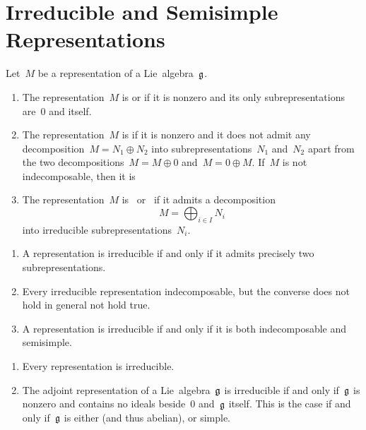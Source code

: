 \section{Irreducible and Semisimple Representations}


\begin{definition}
	Let~$M$ be a representation of a Lie~algebra~$\mathfrak{g}$.
	\begin{enumerate}
		\item
			The representation~$M$ is  or  if it is nonzero and its only subrepresentations are~$0$ and itself.
		\item
			The representation~$M$ is  if it is nonzero and it does not admit any decomposition~$M = N_1 \oplus N_2$ into subrepresentations~$N_1$ and~$N_2$ apart from the two decompositions~$M = M \oplus 0$ and~$M = 0 \oplus M$.
			If~$M$ is not indecomposable, then it is 
		\item
			The representation~$M$ is~ or~ if it admits a decomposition
			\[
				M = \bigoplus_{i \in I} N_i
			\]
			into irreducible subrepresentations~$N_i$.
	\end{enumerate}
\end{definition}


\begin{remark}
	\leavevmode
	\begin{enumerate}
		\item
			A representation is irreducible if and only if it admits precisely two subrepresentations.
		\item
			Every irreducible representation indecomposable, but the converse does not hold in general not hold true.
		\item
			A representation is irreducible if and only if it is both indecomposable and semisimple.
	\end{enumerate}
\end{remark}


\begin{example}
	\leavevmode
	\begin{enumerate}
		\item
			Every {\onedimensional} representation is irreducible.
		\item
			The adjoint representation of a Lie~algebra~$\mathfrak{g}$ is irreducible if and only if~$\mathfrak{g}$ is nonzero and contains no ideals beside~$0$ and~$\mathfrak{g}$ itself.
			This is the case if and only if~$\mathfrak{g}$ is either {\onedimensional} (and thus abelian), or simple.
	\end{enumerate}
\end{example}


